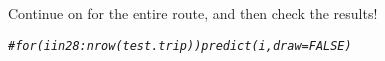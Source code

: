 \documentclass[11pt]{article}\usepackage[]{graphicx}\usepackage[]{color}
\makeatletter
\newcommand{\hlcom}[1]{\textcolor[rgb]{0.678,0.584,0.686}{\textit{#1}}}%
\newenvironment{kframe}{%
 \def\at@end@of@kframe{}%
 \ifinner\ifhmode%
  \def\at@end@of@kframe{\end{minipage}}%
  \begin{minipage}{\columnwidth}%
 \fi\fi%
 \def\FrameCommand##1{\hskip\@totalleftmargin \hskip-\fboxsep
 \colorbox{shadecolor}{##1}\hskip-\fboxsep
     \hskip-\linewidth \hskip-\@totalleftmargin \hskip\columnwidth}%
 \MakeFramed {\advance\hsize-\width
   \@totalleftmargin\z@ \linewidth\hsize
   \@setminipage}}%
 {\par\unskip\endMakeFramed%
 \at@end@of@kframe}
\newenvironment{knitrout}{}{} %
\makeatother
\begin{document}
Continue on for the entire route, and then check the results!
\begin{knitrout}
\color{fgcolor}\begin{kframe}
\begin{alltt}
\hlcom{#for(i in 28:nrow(test.trip)) predict(i, draw = FALSE)}
\end{alltt}
\end{kframe}
\end{knitrout}
\end{document}
